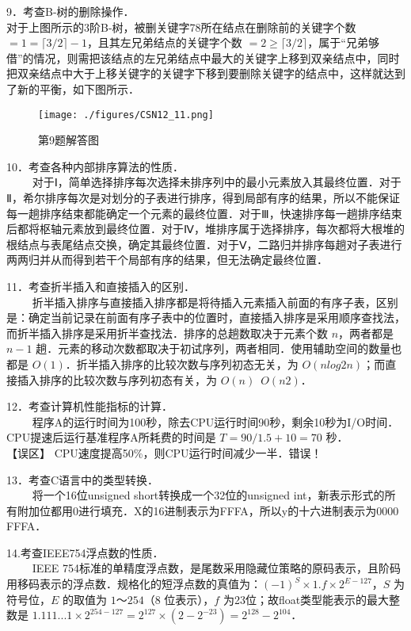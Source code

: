 9．考查B-树的删除操作．\\
对于上图所示的3阶B-树，被删关键字78所在结点在删除前的关键字个数 $=1= \lceil 3/2 \rceil -1$，且其左兄弟结点的关键字个数 $=2 \ge \lceil 3/2 \rceil $，属于“兄弟够借”的情况，则需把该结点的左兄弟结点中最大的关键字上移到双亲结点中，同时把双亲结点中大于上移关键字的关键字下移到要删除关键字的结点中，这样就达到了新的平衡，如下图所示．
\begin{figure}[ht]
\centering
\texttt{[image: ./figures/CSN12\_11.png]}
\caption{第9题解答图} \label{CSN12_fig11}
\end{figure}

10．考查各种内部排序算法的性质．\\
$\qquad$ 对于Ⅰ，简单选择排序每次选择未排序列中的最小元素放入其最终位置．对于Ⅱ，希尔排序每次是对划分的子表进行排序，得到局部有序的结果，所以不能保证每一趟排序结束都能确定一个元素的最终位置．对于Ⅲ，快速排序每一趟排序结束后都将枢轴元素放到最终位置．对于Ⅳ，堆排序属于选择排序，每次都将大根堆的根结点与表尾结点交换，确定其最终位置．对于Ⅴ，二路归并排序每趟对子表进行两两归并从而得到若干个局部有序的结果，但无法确定最终位置．

11．考查折半插入和直接插入的区别．\\
$\qquad$ 折半插入排序与直接插入排序都是将待插入元素插入前面的有序子表，区别是：确定当前记录在前面有序子表中的位置时，直接插入排序是采用顺序查找法，而折半插入排序是采用折半查找法．排序的总趟数取决于元素个数 $n$，两者都是 $n-1$ 趟．元素的移动次数都取决于初试序列，两者相同．使用辅助空间的数量也都是 $O(1)$．折半插入排序的比较次数与序列初态无关，为 $O(nlog2n)$；而直接插入排序的比较次数与序列初态有关，为 $O(n)$~$O(n2)$．

12．考查计算机性能指标的计算．\\
$\qquad$ 程序A的运行时间为100秒，除去CPU运行时间90秒，剩余10秒为I/O时间．CPU提速后运行基准程序A所耗费的时间是 $T=90/1.5+10=70$ 秒． \\
【误区】 CPU速度提高50\%，则CPU运行时间减少一半．错误！

13．考查C语言中的类型转换．\\
$\qquad$ 将一个16位unsigned short转换成一个32位的unsigned int，新表示形式的所有附加位都用0进行填充．X的16进制表示为FFFA，所以y的十六进制表示为0000 FFFA．

14.考查IEEE754浮点数的性质．\\
$\qquad$ IEEE 754标准的单精度浮点数，是尾数采用隐藏位策略的原码表示，且阶码用移码表示的浮点数．规格化的短浮点数的真值为：$(-1)^S\times1.f\times2^{E-127}$，$S$ 为符号位，$E$ 的取值为 $1$～$254$（$8$ 位表示），$f$ 为23位；故float类型能表示的最大整数是 $1.111...1 \times 2^{254-127}=2^{127} \times (2-2^{-23})=2^{128}-2^{104}$．

